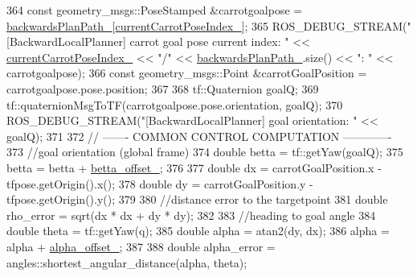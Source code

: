 \begin{DoxyCode}
364                 \textcolor{keyword}{const} geometry\_msgs::PoseStamped &carrotgoalpose = 
      \hyperlink{classcl__move__base__z_1_1backward__local__planner_1_1BackwardLocalPlanner_ad9cde5c85f782cab2ddb4030e3c3f2cf}{backwardsPlanPath\_}[\hyperlink{classcl__move__base__z_1_1backward__local__planner_1_1BackwardLocalPlanner_a2e8f2b78bc97f27c5fa431f3af2261ed}{currentCarrotPoseIndex\_}];
365                 ROS\_DEBUG\_STREAM(\textcolor{stringliteral}{"[BackwardLocalPlanner] carrot goal pose current index: "} << 
      \hyperlink{classcl__move__base__z_1_1backward__local__planner_1_1BackwardLocalPlanner_a2e8f2b78bc97f27c5fa431f3af2261ed}{currentCarrotPoseIndex\_} << \textcolor{stringliteral}{"/"} << \hyperlink{classcl__move__base__z_1_1backward__local__planner_1_1BackwardLocalPlanner_ad9cde5c85f782cab2ddb4030e3c3f2cf}{backwardsPlanPath\_}.size() << \textcolor{stringliteral}{": 
      "} << carrotgoalpose);
366                 \textcolor{keyword}{const} geometry\_msgs::Point &carrotGoalPosition = carrotgoalpose.pose.position;
367 
368                 tf::Quaternion goalQ;
369                 tf::quaternionMsgToTF(carrotgoalpose.pose.orientation, goalQ);
370                 ROS\_DEBUG\_STREAM(\textcolor{stringliteral}{"[BackwardLocalPlanner] goal orientation: "} << goalQ);
371 
372                 \textcolor{comment}{// ------- COMMON CONTROL COMPUTATION -------------}
373                 \textcolor{comment}{//goal orientation (global frame)}
374                 \textcolor{keywordtype}{double} betta = tf::getYaw(goalQ);
375                 betta = betta + \hyperlink{classcl__move__base__z_1_1backward__local__planner_1_1BackwardLocalPlanner_a07e5f16f6951cca1e6d3483f345d0bb1}{betta\_offset\_};
376 
377                 \textcolor{keywordtype}{double} dx = carrotGoalPosition.x - tfpose.getOrigin().x();
378                 \textcolor{keywordtype}{double} dy = carrotGoalPosition.y - tfpose.getOrigin().y();
379 
380                 \textcolor{comment}{//distance error to the targetpoint}
381                 \textcolor{keywordtype}{double} rho\_error = sqrt(dx * dx + dy * dy);
382 
383                 \textcolor{comment}{//heading to goal angle}
384                 \textcolor{keywordtype}{double} theta = tf::getYaw(q);
385                 \textcolor{keywordtype}{double} alpha = atan2(dy, dx);
386                 alpha = alpha + \hyperlink{classcl__move__base__z_1_1backward__local__planner_1_1BackwardLocalPlanner_a09765b08935d9355447c44776e1b1c3a}{alpha\_offset\_};
387 
388                 \textcolor{keywordtype}{double} alpha\_error = angles::shortest\_angular\_distance(alpha, theta);

\end{DoxyCode}
